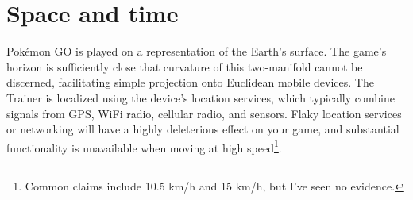 \chapter{Space and time\label{chap:timespace}}
Pokémon GO is played on a representation of the Earth's surface.
The game's horizon is sufficiently close that curvature of this two-manifold
 cannot be discerned, facilitating simple projection onto Euclidean mobile devices.
The Trainer is localized using the device's location services, which typically
 combine signals from GPS, WiFi radio, cellular radio, and sensors.
Flaky location services or networking will have a highly deleterious effect on your game,
 and substantial functionality is unavailable when moving at high speed\footnote{Common
 claims include 10.5 km/h and 15 km/h, but I've seen no evidence.}.

